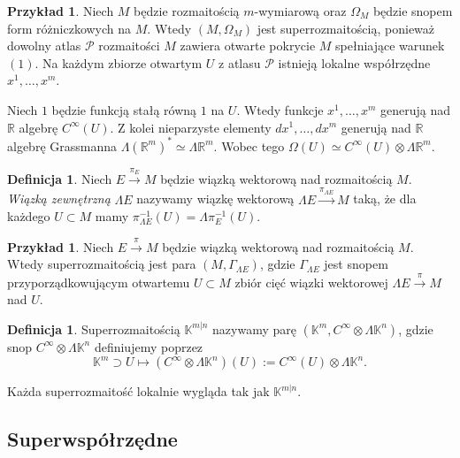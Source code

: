 \documentclass[11pt,a4paper]{report}
\theoremstyle{definition}
\newtheorem{example}[theorem]{Przykład}
\newtheorem{definition}[theorem]{Definicja}
\begin{document}
\begin{example}
	Niech $M$ będzie rozmaitością $m$-wymiarową oraz $\Omega_M$ będzie snopem form różniczkowych na $M$. Wtedy $(M, \Omega_M)$ jest superrozmaitością, ponieważ dowolny atlas $\mathcal{P}$ rozmaitości $M$ zawiera otwarte pokrycie $M$ spełniające warunek $(1)$. Na każdym zbiorze otwartym $U$ z atlasu $\mathcal{P}$ istnieją lokalne współrzędne $x^1, \ldots, x^m$. 
				
	Niech $1$ będzie funkcją stałą równą $1$ na $U$. Wtedy funkcje $x^1, \ldots, x^m$ generują nad $\mathbb{R}$ algebrę $C^\infty (U)$. Z kolei nieparzyste elementy $dx^1, \ldots, dx^m$ generują nad $\mathbb{R}$ algebrę Grassmanna $\Lambda (\mathbb{R}^m)^* \simeq \Lambda \mathbb{R}^m$. Wobec tego $\Omega(U) \simeq C^\infty (U) \otimes \Lambda \mathbb{R}^m$.
\end{example}

\begin{definition}
	Niech $E \stackrel{\pi_E}{\rightarrow} M$ będzie wiązką wektorową \cite{frankel} nad rozmaitością $M$. \textit{Wiązką zewnętrzną} $\Lambda E$ nazywamy wiązkę wektorową $\Lambda E \stackrel{\pi_{\Lambda E}}{\rightarrow} M$ taką, że dla każdego $U \subset M$ mamy $\pi_{\Lambda E}^{-1}(U) = \Lambda \pi_E ^{-1}(U)$.
\end{definition}

\begin{example}
	Niech $E \stackrel{\pi}{\rightarrow} M$ będzie wiązką wektorową nad rozmaitością $M$. Wtedy superrozmaitością jest para $(M, \Gamma_{\Lambda E})$, gdzie $\Gamma_{\Lambda E}$ jest snopem przyporządkowującym otwartemu $U \subset M$ zbiór cięć wiązki wektorowej $\Lambda E \stackrel{\pi}{\rightarrow} M$ nad $U$.
\end{example}

\begin{definition}
	Superrozmaitością $\mathbb{K}^{m|n}$ nazywamy parę $(\mathbb{K}^m, C^\infty \otimes \Lambda \mathbb{K}^n)$, gdzie snop $C^\infty \otimes \Lambda \mathbb{K}^n$ definiujemy poprzez
	\begin{equation*}
		\mathbb{K}^m \supset U \mapsto \left( C^\infty \otimes \Lambda \mathbb{K}^n \right) (U) := C^\infty (U) \otimes \Lambda \mathbb{K}^n.
	\end{equation*}
\end{definition}

Każda superrozmaitość lokalnie wygląda tak jak $\mathbb{K}^{m|n}$.

\subsection{Superwspółrzędne}
\end{document}
